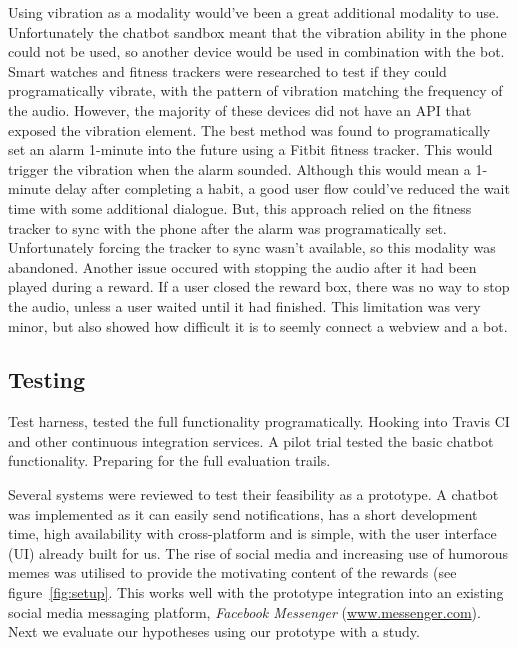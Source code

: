 Using vibration as a modality would've been a great additional modality to use.
Unfortunately the chatbot sandbox meant that the vibration ability in the phone could not be used, so another device would be used in combination with the bot.
Smart watches and fitness trackers were researched to test if they could programatically vibrate, with the pattern of vibration matching the frequency of the audio.
However, the majority of these devices did not have an API that exposed the vibration element. The best method was found to programatically set an alarm 1-minute into the future using a Fitbit fitness tracker.
This would trigger the vibration when the alarm sounded.
Although this would mean a 1-minute delay after completing a habit, a good user flow could've reduced the wait time with some additional dialogue.
But, this approach relied on the fitness tracker to sync with the phone after the alarm was programatically set. Unfortunately forcing the tracker to sync wasn't available, so this modality was abandoned.\newline
\newline
Another issue occured with stopping the audio after it had been played during a reward. If a user closed the reward box, there was no way to stop the audio, unless a user waited until it had finished. This limitation was very minor, but also showed how difficult it is to seemly connect a webview and a bot.


\subsection{Testing}

Test harness, tested the full functionality programatically. Hooking into Travis CI and other continuous integration services.
A pilot trial tested the basic chatbot functionality. Preparing for the full evaluation trails.


Several systems were reviewed to test their feasibility as a prototype. A chatbot was implemented as it can easily send notifications, has a short development time, high availability with cross-platform and is simple, with the user interface (UI) already built for us. The rise of social media and increasing use of humorous memes was utilised to provide the motivating content of the rewards (see figure~\ref{fig:setup}. This works well with the prototype integration into an existing social media messaging platform, \textit{Facebook Messenger} (\url{www.messenger.com}). Next we evaluate our hypotheses using our prototype with a study.
\newpage